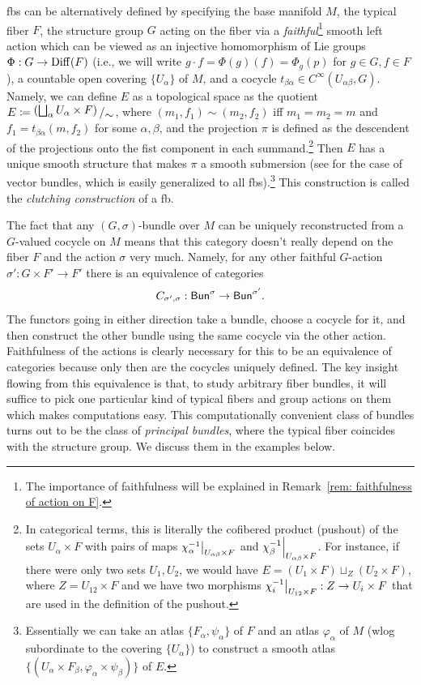 \begin{defn}\label{def bundle construction}
    \Glspl{fb} can be alternatively defined by specifying the base manifold $M$, the typical fiber $F$, the structure group $G$ acting on the fiber via a \emph{faithful}\footnote{The importance of faithfulness will be explained in Remark~\ref{rem: faithfulness of action on F}.} smooth left action which can be viewed as an injective homomorphism of Lie groups $\Phi:G\to \operatorname{Diff}(F)$ (i.e., we will write $g\cdot f=\Phi(g)(f)=\Phi_g(p)$ for $g\in G, f\in F$), a countable open covering $\{U_\alpha\}$ of $M$, and a cocycle  $t_{\beta\alpha}\in C^\infty (U_{\alpha\beta}, G)$. Namely, we can define $E$ as a topological space as the quotient $E\coloneqq \bigslant{(\bigsqcup_\alpha U_\alpha \times F)}{\sim}$, where $(m_1,f_1)\sim(m_2,f_2)$ iff $m_1=m_2=m$ and $f_1=t_{\beta\alpha}(m,f_2)$ for some $\alpha,\beta$, and the projection $\pi$ is defined as the descendent of the projections onto the fist component in each summand.\footnote{In categorical terms, this is literally the cofibered product (pushout) of the sets $U_\alpha \times F$ with pairs of maps $\restr{\chi_\alpha^{-1}}{U_{\alpha\beta}\times F}$ and $\restr{\chi_\beta^{-1}}{U_{\alpha\beta}\times F}$. For instance, if there were only two sets $U_1,U_2$, we would have $E=(U_1\times F)\sqcup_Z (U_2\times F)$, where $Z=U_{12}\times F$ and we have two morphisms $\restr{\chi_i^{-1}}{U_{12}\times F}:Z\to U_i\times F$ that are used in the definition of the pushout.}
    Then $E$ has a unique smooth structure that makes $\pi$ a smooth submersion (see \cite[Lem.~10.6]{Lee} for the case of vector bundles, which is easily generalized to all \glspl{fb}).\footnote{Essentially we can take an atlas $\{F_\alpha,\psi_\alpha\}$ of $F$ and an atlas $\varphi_\alpha$ of $M$ (\gls{wlog} subordinate to the covering $\{U_\alpha\}$) to construct a smooth atlas $\{(U_\alpha\times F_\beta,\varphi_\alpha\times\psi_\beta)\}$ of $E$.} This construction is called the \emph{clutching construction} of a \gls{fb}.
\end{defn}


The fact that any $(G,\sigma)$-bundle over $M$ can be uniquely reconstructed from a $G$-valued cocycle on $M$ means that this category doesn't really depend on the fiber $F$ and the action $\sigma$ very much. Namely, for any other faithful $G$-action $\sigma':G\times F'\to F'$ there is an equivalence of categories
\[C_{\sigma',\sigma}:\mathsf{Bun}^\sigma\to \mathsf{Bun}^{\sigma'}.\label{eq equivalence of bundle categories}\]
The functors going in either direction take a bundle, choose a cocycle for it, and then construct the other bundle using the same cocycle via the other action. Faithfulness of the actions is clearly necessary for this to be an equivalence of categories because only then are the cocycles uniquely defined. The key insight flowing from this equivalence is that, to study arbitrary fiber bundles, it will suffice to pick one particular kind of typical fibers and group actions on them which makes computations easy. This computationally convenient class of bundles turns out to be the class of \emph{principal bundles}, where the typical fiber coincides with the structure group. We discuss them in the examples below.




